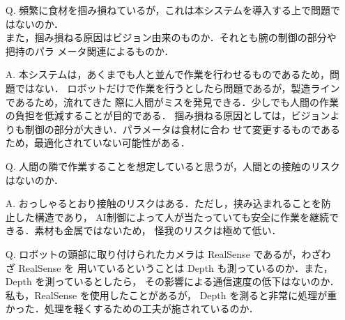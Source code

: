\documentclass{jsarticle}
\begin{document}
\begin{itemize}
  \addtolength{\itemindent}{5.4zw}
  \item [Q.]頻繁に食材を掴み損ねているが，これは本システムを導入する上で問題ではないのか．\\
  \hspace*{5.5zw}また，掴み損ねる原因はビジョン由来のものか．それとも腕の制御の部分や把持のパラ
  \hspace*{5.5zw}メータ関連によるものか．
  \vspace*{1zh}

  \item [A.]本システムは，あくまでも人と並んで作業を行わせるものであるため，問題ではない．
  \hspace*{5.5zw}ロボットだけで作業を行うとしたら問題であるが，製造ラインであるため，流れてきた
  \hspace*{5.5zw}際に人間がミスを発見できる．少しでも人間の作業の負担を低減することが目的である．
  \hspace*{5.5zw}掴み損ねる原因としては，ビジョンよりも制御の部分が大きい．パラメータは食材に合わ
  \hspace*{5.5zw}せて変更するものであるため，最適化されていない可能性がある．


  \newpage
  \vspace*{-10zh}

  \item [Q.]人間の隣で作業することを想定していると思うが，人間との接触のリスクはないのか．
  \vspace*{1zh}

  \item [A.]おっしゃるとおり接触のリスクはある．ただし，挟み込まれることを防止した構造であり，
  \hspace*{5.5zw}AI制御によって人が当たっていても安全に作業を継続できる．素材も金属ではないため，
  \hspace*{5.5zw}怪我のリスクは極めて低い．\\
  \vspace*{1zh}


  \item [Q.]ロボットの頭部に取り付けられたカメラは RealSense であるが，わざわざ RealSense を
  \hspace*{5.5zw}用いているということは Depth も測っているのか．また，Depth を測っているとしたら，
  \hspace*{5.5zw}その影響による通信速度の低下はないのか．私も，RealSense を使用したことがあるが，
  \hspace*{5.5zw}Depth を測ると非常に処理が重かった．処理を軽くするための工夫が施されているのか．
  \vspace*{1zh}


\end{itemize}
\end{document}
